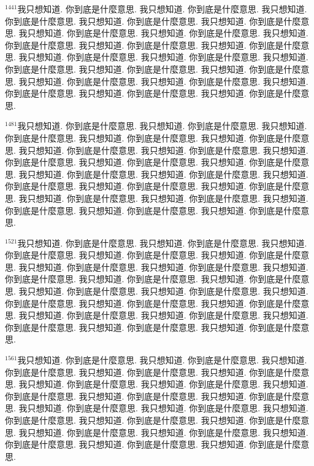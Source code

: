 \documentclass{book}
\begin{document}
$^{1441}$我只想知道.
你到底是什麼意思.
我只想知道.
你到底是什麼意思.
我只想知道.
你到底是什麼意思.
我只想知道.
你到底是什麼意思.
我只想知道.
你到底是什麼意思.
我只想知道.
你到底是什麼意思.
我只想知道.
你到底是什麼意思.
我只想知道.
你到底是什麼意思.
我只想知道.
你到底是什麼意思.
我只想知道.
你到底是什麼意思.
我只想知道.
你到底是什麼意思.
我只想知道.
你到底是什麼意思.
我只想知道.
你到底是什麼意思.
我只想知道.
你到底是什麼意思.
我只想知道.
你到底是什麼意思.
我只想知道.
你到底是什麼意思.
我只想知道.
你到底是什麼意思.
我只想知道.
你到底是什麼意思.
我只想知道.
你到底是什麼意思.
我只想知道.
你到底是什麼意思.

$^{1481}$我只想知道.
你到底是什麼意思.
我只想知道.
你到底是什麼意思.
我只想知道.
你到底是什麼意思.
我只想知道.
你到底是什麼意思.
我只想知道.
你到底是什麼意思.
我只想知道.
你到底是什麼意思.
我只想知道.
你到底是什麼意思.
我只想知道.
你到底是什麼意思.
我只想知道.
你到底是什麼意思.
我只想知道.
你到底是什麼意思.
我只想知道.
你到底是什麼意思.
我只想知道.
你到底是什麼意思.
我只想知道.
你到底是什麼意思.
我只想知道.
你到底是什麼意思.
我只想知道.
你到底是什麼意思.
我只想知道.
你到底是什麼意思.
我只想知道.
你到底是什麼意思.
我只想知道.
你到底是什麼意思.
我只想知道.
你到底是什麼意思.
我只想知道.
你到底是什麼意思.

$^{1521}$我只想知道.
你到底是什麼意思.
我只想知道.
你到底是什麼意思.
我只想知道.
你到底是什麼意思.
我只想知道.
你到底是什麼意思.
我只想知道.
你到底是什麼意思.
我只想知道.
你到底是什麼意思.
我只想知道.
你到底是什麼意思.
我只想知道.
你到底是什麼意思.
我只想知道.
你到底是什麼意思.
我只想知道.
你到底是什麼意思.
我只想知道.
你到底是什麼意思.
我只想知道.
你到底是什麼意思.
我只想知道.
你到底是什麼意思.
我只想知道.
你到底是什麼意思.
我只想知道.
你到底是什麼意思.
我只想知道.
你到底是什麼意思.
我只想知道.
你到底是什麼意思.
我只想知道.
你到底是什麼意思.
我只想知道.
你到底是什麼意思.
我只想知道.
你到底是什麼意思.

$^{1561}$我只想知道.
你到底是什麼意思.
我只想知道.
你到底是什麼意思.
我只想知道.
你到底是什麼意思.
我只想知道.
你到底是什麼意思.
我只想知道.
你到底是什麼意思.
我只想知道.
你到底是什麼意思.
我只想知道.
你到底是什麼意思.
我只想知道.
你到底是什麼意思.
我只想知道.
你到底是什麼意思.
我只想知道.
你到底是什麼意思.
我只想知道.
你到底是什麼意思.
我只想知道.
你到底是什麼意思.
我只想知道.
你到底是什麼意思.
我只想知道.
你到底是什麼意思.
我只想知道.
你到底是什麼意思.
我只想知道.
你到底是什麼意思.
我只想知道.
你到底是什麼意思.
我只想知道.
你到底是什麼意思.
我只想知道.
你到底是什麼意思.
我只想知道.
你到底是什麼意思.
\end{document}
